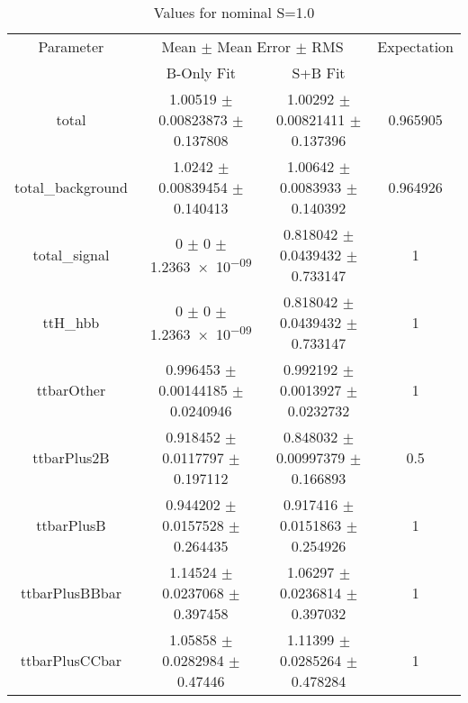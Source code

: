 \begin{table}
\centering
\caption{Values for nominal S=1.0}
\begin{tabular}{cccc}
\toprule
Parameter & \multicolumn{2}{c}{Mean $\pm$ Mean Error $\pm$ RMS} & Expectation\\
 & B-Only Fit & S+B Fit & \\
\midrule
total & \num{1.00519} $\pm$ \num{0.00823873} $\pm$ \num{0.137808} & \num{1.00292} $\pm$ \num{0.00821411} $\pm$ \num{0.137396} & \num{0.965905}\\
total\_background & \num{1.0242} $\pm$ \num{0.00839454} $\pm$ \num{0.140413} & \num{1.00642} $\pm$ \num{0.0083933} $\pm$ \num{0.140392} & \num{0.964926}\\
total\_signal & \num{0} $\pm$ \num{0} $\pm$ \num{1.2363e-09} & \num{0.818042} $\pm$ \num{0.0439432} $\pm$ \num{0.733147} & \num{1}\\
ttH\_hbb & \num{0} $\pm$ \num{0} $\pm$ \num{1.2363e-09} & \num{0.818042} $\pm$ \num{0.0439432} $\pm$ \num{0.733147} & \num{1}\\
ttbarOther & \num{0.996453} $\pm$ \num{0.00144185} $\pm$ \num{0.0240946} & \num{0.992192} $\pm$ \num{0.0013927} $\pm$ \num{0.0232732} & \num{1}\\
ttbarPlus2B & \num{0.918452} $\pm$ \num{0.0117797} $\pm$ \num{0.197112} & \num{0.848032} $\pm$ \num{0.00997379} $\pm$ \num{0.166893} & \num{0.5}\\
ttbarPlusB & \num{0.944202} $\pm$ \num{0.0157528} $\pm$ \num{0.264435} & \num{0.917416} $\pm$ \num{0.0151863} $\pm$ \num{0.254926} & \num{1}\\
ttbarPlusBBbar & \num{1.14524} $\pm$ \num{0.0237068} $\pm$ \num{0.397458} & \num{1.06297} $\pm$ \num{0.0236814} $\pm$ \num{0.397032} & \num{1}\\
ttbarPlusCCbar & \num{1.05858} $\pm$ \num{0.0282984} $\pm$ \num{0.47446} & \num{1.11399} $\pm$ \num{0.0285264} $\pm$ \num{0.478284} & \num{1}\\
\bottomrule
\end{tabular}
\end{table}